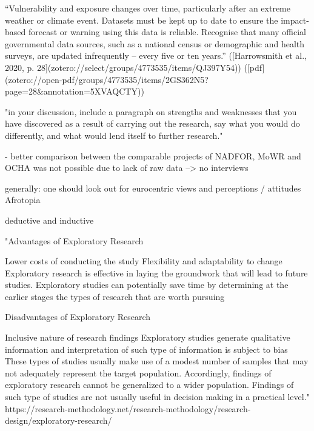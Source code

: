 “Vulnerability and exposure changes over time, particularly after an extreme weather or climate event. Datasets must be kept up to date to ensure the impact-based forecast or warning using this data is reliable. Recognise that many official governmental data sources, such as a national census or demographic and health surveys, are updated infrequently – every five or ten years.” ([Harrowsmith et al., 2020, p. 28](zotero://select/groups/4773535/items/QJ397Y54)) ([pdf](zotero://open-pdf/groups/4773535/items/2GS362N5?page=28&annotation=5XVAQCTY))



"in your discussion, include a paragraph on strengths and weaknesses that you have discovered as a result of carrying out the research, say what you would do differently, and what would lend itself to further research."

- better comparison between the comparable projects of NADFOR, MoWR and OCHA was not possible due to lack of raw data --> no interviews

generally: one should look out for eurocentric views and perceptions / attitudes
Afrotopia

deductive and inductive


"Advantages of Exploratory Research

    Lower costs of conducting the study
    Flexibility and adaptability to change
    Exploratory research is effective in laying the groundwork that will lead to future studies.
    Exploratory studies can potentially save time by determining at the earlier stages the types of research that are worth pursuing

Disadvantages of Exploratory Research

    Inclusive nature of research findings
    Exploratory studies generate qualitative information and interpretation of such type of information is subject to bias
    These types of studies usually make use of a modest number of samples that may not adequately represent the target population. Accordingly, findings of exploratory research cannot be generalized to a wider population.
    Findings of such type of studies are not usually useful in decision making in a practical level."
    https://research-methodology.net/research-methodology/research-design/exploratory-research/

